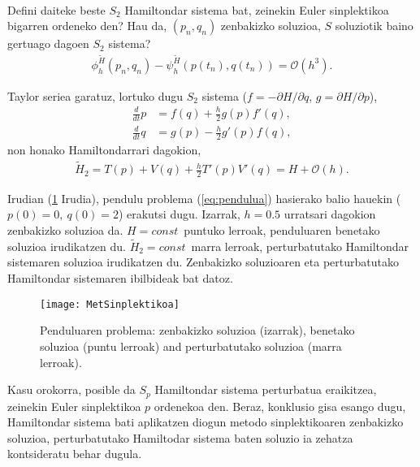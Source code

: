 \paragraph*{}Defini daiteke beste $S_2$ Hamiltondar sistema bat, zeinekin Euler sinplektikoa bigarren ordeneko den? Hau da, $(p_n,q_n)$ zenbakizko soluzioa, $S$ soluziotik baino gertuago dagoen $S_2$ sistema? 
\begin{align*}
\phi_h^{\widetilde{H}}(p_n,q_n)-\psi_h^{\widetilde{H}}(p(t_n),q(t_n))= \mathcal{O}(h^3).
\end{align*}

Taylor seriea garatuz, lortuko dugu $S_2$ sistema  ($f=-\partial H/\partial q$, $g=\partial H/\partial p$),
\begin{align*}
\frac{d}{dt} p &= f(q)+ \frac{h}{2} g(p) f'(q),\\
\frac{d}{dt} q &= g(p)- \frac{h}{2} g'(p) f(q),
\end{align*} 
non honako Hamiltondarrari dagokion,
\begin{align*}
\widetilde{H}_2=T(p)+V(q)+\frac{h}{2} T'(p) V'(q) = H+\mathcal{O}(h).
\end{align*}

Irudian (\ref{fig:MetSinplektikoa} Irudia), pendulu problema (\ref{eq:pendulua}) hasierako balio hauekin ($p(0)=0, \ q(0)=2$) erakutsi dugu. Izarrak, $h=0.5$ urratsari dagokion zenbakizko soluzioa da. $H=const$~puntuko lerroak, penduluaren benetako soluzioa irudikatzen du.  $\widetilde{H}_2=const$~marra lerroak, perturbatutako Hamiltondar sistemaren soluzioa irudikatzen du. Zenbakizko soluzioaren eta perturbatutako Hamiltondar sistemaren ibilbideak bat datoz. 

\begin{figure}[h!]
\centering
\texttt{[image: MetSinplektikoa]}
\caption{ \small Penduluaren problema: zenbakizko soluzioa (izarrak), benetako soluzioa (puntu lerroak) and perturbatutako soluzioa (marra lerroak).}
\label{fig:MetSinplektikoa}
\end{figure}

Kasu orokorra, posible da $S_p$ Hamiltondar sistema perturbatua eraikitzea, zeinekin Euler sinplektikoa $p$ ordenekoa den. Beraz, konklusio gisa esango dugu, Hamiltondar sistema bati aplikatzen diogun metodo sinplektikoaren zenbakizko soluzioa, perturbatutako Hamiltodar sistema baten soluzio ia zehatza kontsideratu behar dugula. 


